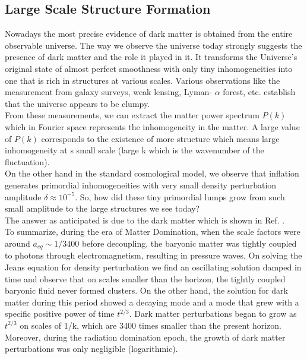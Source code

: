 \subsection{Large Scale Structure Formation}
\hspace{0.5cm}Nowadays the most precise evidence of dark matter is obtained from the entire observable universe. The way we observe the universe today strongly suggests the presence of dark matter and the role it played in it. It transforms the Universe's original state of almost perfect smoothness with only tiny inhomogeneities into one that is rich in structures at various scales.
Various observations like the measurement from galaxy surveys, weak lensing, Lyman- $\alpha$ forest, etc. establish that the universe appears to be clumpy.\\
\hspace{0.5cm}From these measurements, we can extract the matter power spectrum ${P}(k)$ which in Fourier space represents the inhomogeneity in the matter. A large value of ${P}(k)$ corresponds to the existence  of more structure which means large inhomogeneity at s small scale (large k which is the wavenumber of the fluctuation).\\
\hspace{0.5cm}On the other hand in the standard cosmological model, we observe that inflation generates primordial inhomogeneities with very small density perturbation  amplitude $\delta \approx 10^{-5}$. So, how did these tiny primordial lumps grow from such small amplitude to the large structures we see today?\\
The answer as anticipated is due to the dark matter which is shown in Ref. \cite{Cirelli}.\\
\hspace{0.5cm}To summarize, during the era of Matter Domination, when the scale factors were around $a_{eq} \sim 1/3400$ before decoupling, the baryonic matter was tightly coupled to photons through electromagnetism, resulting in pressure waves. On solving the Jeans equation for density perturbation we find an oscillating solution damped in time and observe that on scales smaller than the horizon, the tightly coupled baryonic fluid never formed clusters. On the other hand, the solution for dark matter during this period showed a decaying mode and a mode that grew with a specific positive power of time $t^{2/3}$. Dark matter perturbations began to grow as $t^{2/3}$ on scales of 1/k, which are 3400 times smaller than the present horizon. Moreover, during the radiation domination epoch, the growth of dark matter perturbations was only negligible (logarithmic).

